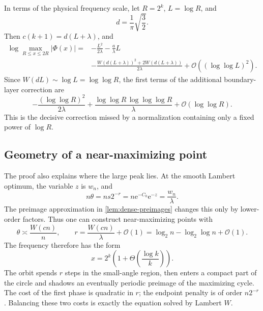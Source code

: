 \documentclass[11pt,oneside]{article}
\theoremstyle{definition}
\theoremstyle{remark}
\newcommand{\e}{\mathrm e}
\newcommand{\bigO}{\mathcal O}
\newcommand{\PhiF}{\Phi}
\begin{document}
In terms of the physical frequency scale, let \(R=2^k\),
\(L=\log R\), and
\begin{equation}
 d=\frac1\pi\sqrt{\frac32}.
 \label{eq:d-constant}
\end{equation}
Then \(c(k+1)=d(L+\lambda)\), and
\begin{equation}
\begin{split}
 \log\max_{R\le x\le2R}|\PhiF(x)|
 ={}&-\frac{L^2}{2\lambda}-\frac{a}{\lambda}L\\
 &-\frac{W(d(L+\lambda))^2+2W(d(L+\lambda))}{2\lambda}
 +\bigO\!\left((\log\log L)^2\right).
\end{split}
\label{eq:annulus-R-Lambert}
\end{equation}
Since \(W(dL)\sim\log L=\log\log R\), the first terms of the additional
boundary-layer correction are
\begin{equation}
 -\frac{(\log\log R)^2}{2\lambda}
 +\frac{\log\log R\,\log\log\log R}{\lambda}
 +\bigO(\log\log R).
 \label{eq:second-lognormal}
\end{equation}
This is the decisive correction missed by a normalization containing only a
fixed power of \(\log R\).

\subsection{Geometry of a near-maximizing point}

The proof also explains where the large peak lies.  At the smooth Lambert
optimum, the variable \(z\) is \(w_n\), and
\[
 n\theta=n s2^{-r}
 =n\e^{-C_0}\e^{-z}
 =\frac{w_n}{\lambda}.
\]
The preimage approximation in \cref{lem:dense-preimages} changes this only by
lower-order factors.  Thus one can construct near-maximizing points with
\begin{equation}
 \theta\asymp\frac{W(cn)}{n},
 \qquad
 r=\frac{W(cn)}{\lambda}+\bigO(1)
 =\log_2 n-\log_2\log n+\bigO(1).
 \label{eq:near-max-location}
\end{equation}
The frequency therefore has the form
\begin{equation}
 x=2^k\left(1+\Theta\!\left(\frac{\log k}{k}\right)\right).
 \label{eq:near-max-x}
\end{equation}
The orbit spends \(r\) steps in the small-angle region, then enters a compact
part of the circle and shadows an eventually periodic preimage of the
maximizing cycle.  The cost of the first phase is quadratic in \(r\); the
endpoint penalty is of order \(n2^{-r}\).  Balancing these two costs is exactly
the equation solved by Lambert \(W\).
\end{document}
